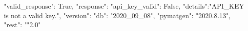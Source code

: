 {"valid_response": True,
"response":
  {"api_key_valid": False,
  "details":"API_KEY is not a valid key.",
  "version":
    {"db": "2020_09_08",
    "pymatgen": "2020.8.13",
    "rest": ""2.0"}
  }
}
